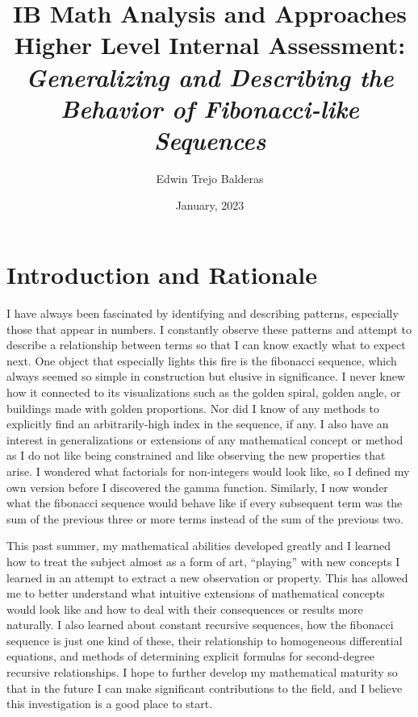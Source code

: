 \documentclass[11pt]{article}
\title{IB Math Analysis and Approaches Higher Level Internal Assessment: \emph{Generalizing and Describing the Behavior of Fibonacci-like Sequences}}
\author{Edwin Trejo Balderas}
\date{January, 2023}
\begin{document}
\singlespacing

\maketitle

\newpage

\tableofcontents

\newpage

\doublespacing

\section{Introduction and Rationale}

I have always been fascinated by identifying and describing patterns, especially those that appear in numbers. I constantly observe these patterns and attempt to describe a relationship between terms so that I can know exactly what to expect next. One object that especially lights this fire is the fibonacci sequence, which always seemed so simple in construction but elusive in significance. I never knew how it connected to its visualizations such as the golden spiral, golden angle, or buildings made with golden proportions. Nor did I know of any methods to explicitly find an arbitrarily-high index in the sequence, if any. I also have an interest in generalizations or extensions of any mathematical concept or method as I do not like being constrained and like observing the new properties that arise. I wondered what factorials for non-integers would look like, so I defined my own version before I discovered the gamma function. Similarly, I now wonder what the fibonacci sequence would behave like if every subsequent term was the sum of the previous three or more terms instead of the sum of the previous two. 

This past summer, my mathematical abilities developed greatly and I learned how to treat the subject almost as a form of art, “playing” with new concepts I learned in an attempt to extract a new observation or property. This has allowed me to better understand what intuitive extensions of mathematical concepts would look like and how to deal with their consequences or results more naturally. I also learned about constant recursive sequences, how the fibonacci sequence is just one kind of these, their relationship to homogeneous differential equations, and methods of determining explicit formulas for second-degree recursive relationships. I hope to further develop my mathematical maturity so that in the future I can make significant contributions to the field, and I believe this investigation is a good place to start.
\end{document}

